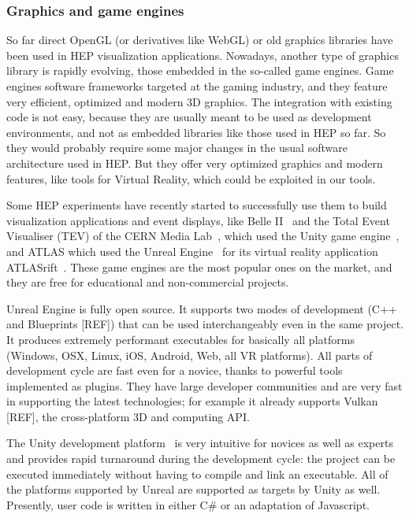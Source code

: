 \documentclass[12pt,a4paper]{article}
\begin{document}
\hypertarget{graphic-engines}{%
\subsubsection{Graphics and game engines}\label{graphic-engines}}

So far direct OpenGL (or derivatives like WebGL) or old graphics libraries have been used in HEP visualization applications. Nowadays,
another type of graphics library is rapidly evolving, those embedded in the so-called game engines. Game engines software frameworks targeted
at the gaming industry, and they feature very efficient, optimized and modern 3D graphics.
The integration with existing code is not easy, because they are usually meant to be used as development environments,
and not as embedded libraries like those used in HEP so far. So they would probably require some major changes in the usual
software architecture used in HEP. But they offer very optimized graphics and modern features, like tools for Virtual Reality,
which could be exploited in our tools.

Some HEP experiments have recently started to successfully use them to build visualization applications and event displays,
like Belle II~\cite{BelleIIVR} and the Total Event Visualiser (TEV) of the CERN Media Lab~\cite{CERNTEV},
which used the Unity game engine~\cite{Unity3D}, and ATLAS which used the Unreal Engine~\cite{EpicUnreal} for
its virtual reality application ATLASrift~\cite{ATLASRift}. These game engines are the most popular ones on the market, and they are
free for educational and non-commercial projects.

Unreal Engine is fully open source. It supports two modes of development (C++ and Blueprints [REF]) that can be used
interchangeably even in the same project. It produces extremely performant executables for basically all platforms
(Windows, OSX, Linux, iOS, Android, Web, all VR platforms). All parts of development cycle are fast even for a novice,
thanks to powerful tools implemented as plugins. They have large developer communities and are very fast in supporting the latest technologies;
for example it already supports Vulkan [REF], the cross-platform 3D and computing API.

The Unity development platform~\cite{Unity3D} is very intuitive for novices as
well as experts and provides rapid turnaround during the development cycle: the project can be executed immediately without having to
compile and link an executable. All of the platforms supported by Unreal are supported as targets by Unity as well. Presently, user code is written in either
C\# or an adaptation of Javascript.
\end{document}
